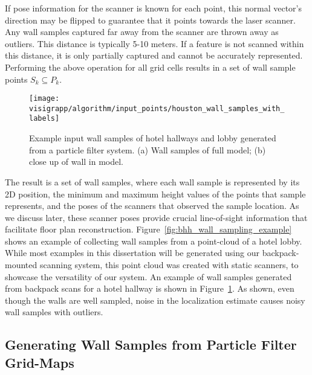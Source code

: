 \documentclass[12pt,onecolumn,oneside]{book}
\begin{document}
If pose information for the scanner is known for each point, this normal vector's direction may be flipped to guarantee that it points towards the laser scanner.  Any wall samples captured far away from the scanner are thrown away as outliers.  This distance is typically 5-10 meters.  If a feature is not scanned within this distance, it is only partially captured and cannot be accurately represented. Performing the above operation for all grid cells results in a set of wall sample points $S_k \subseteq P_k$.  

\begin{figure}
  \centering
  \texttt{[image: visigrapp/algorithm/input\_points/houston\_wall\_samples\_with\_labels]}
  \caption[Wall samples from backpack point cloud.]{Example input wall samples of hotel hallways and lobby generated from a particle filter system. (a) Wall samples of full model; (b) close up of wall in model.}
  \label{fig:backpack_wall_sample_example}
\end{figure}

The result is a set of wall samples, where each wall sample is represented by its 2D position, the minimum and maximum height values of the points that sample represents, and the poses of the scanners that observed the sample location.  As we discuss later, these scanner poses provide crucial line-of-sight information that facilitate floor plan reconstruction.  Figure~\ref{fig:bhh_wall_sampling_example} shows an example of collecting wall samples from a point-cloud of a hotel lobby.  While most examples in this dissertation will be generated using our backpack-mounted scanning system, this point cloud was created with static scanners, to showcase the versatility of our system. An example of wall samples generated from backpack scans for a hotel hallway is shown in Figure~\ref{fig:backpack_wall_sample_example}.  As shown, even though the walls are well sampled, noise in the localization estimate causes noisy wall samples with outliers.

\subsection{Generating Wall Samples from Particle Filter Grid-Maps}
\label{ssec:ws_from_pf}
\end{document}
